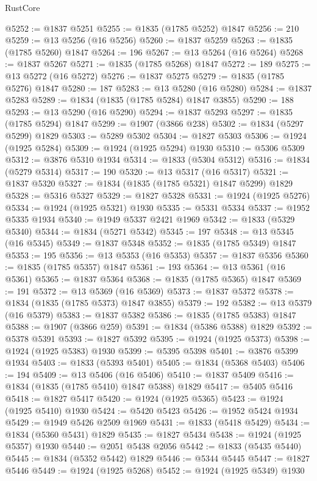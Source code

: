 \begin{lexlean}{RustCore}
\begin{coremodule}
@5252 := @1837 @5251
@5255 := @1835 (@1785 @5252) @1847
@5256 := 210
@5259 := @13 @5256 (@16 @5256)
@5260 := @1837 @5259
@5263 := @1835 (@1785 @5260) @1847
@5264 := 196
@5267 := @13 @5264 (@16 @5264)
@5268 := @1837 @5267
@5271 := @1835 (@1785 @5268) @1847
@5272 := 189
@5275 := @13 @5272 (@16 @5272)
@5276 := @1837 @5275
@5279 := @1835 (@1785 @5276) @1847
@5280 := 187
@5283 := @13 @5280 (@16 @5280)
@5284 := @1837 @5283
@5289 := @1834 (@1835 (@1785 @5284) @1847 @3855)
@5290 := 188
@5293 := @13 @5290 (@16 @5290)
@5294 := @1837 @5293
@5297 := @1835 (@1785 @5294) @1847
@5299 := @1907 (@3866 @238)
@5302 := @1834 (@5297 @5299) @1829
@5303 := @5289 @5302
@5304 := @1827 @5303
@5306 := @1924 (@1925 @5284)
@5309 := @1924 (@1925 @5294) @1930
@5310 := @5306 @5309
@5312 := @3876 @5310 @1934
@5314 := @1833 (@5304 @5312)
@5316 := @1834 (@5279 @5314)
@5317 := 190
@5320 := @13 @5317 (@16 @5317)
@5321 := @1837 @5320
@5327 := @1834 (@1835 (@1785 @5321) @1847 @5299) @1829
@5328 := @5316 @5327
@5329 := @1827 @5328
@5331 := @1924 (@1925 @5276)
@5334 := @1924 (@1925 @5321) @1930
@5335 := @5331 @5334
@5337 := @1952 @5335 @1934
@5340 := @1949 @5337 @2421 @1969
@5342 := @1833 (@5329 @5340)
@5344 := @1834 (@5271 @5342)
@5345 := 197
@5348 := @13 @5345 (@16 @5345)
@5349 := @1837 @5348
@5352 := @1835 (@1785 @5349) @1847
@5353 := 195
@5356 := @13 @5353 (@16 @5353)
@5357 := @1837 @5356
@5360 := @1835 (@1785 @5357) @1847
@5361 := 193
@5364 := @13 @5361 (@16 @5361)
@5365 := @1837 @5364
@5368 := @1835 (@1785 @5365) @1847
@5369 := 191
@5372 := @13 @5369 (@16 @5369)
@5373 := @1837 @5372
@5378 := @1834 (@1835 (@1785 @5373) @1847 @3855)
@5379 := 192
@5382 := @13 @5379 (@16 @5379)
@5383 := @1837 @5382
@5386 := @1835 (@1785 @5383) @1847
@5388 := @1907 (@3866 @259)
@5391 := @1834 (@5386 @5388) @1829
@5392 := @5378 @5391
@5393 := @1827 @5392
@5395 := @1924 (@1925 @5373)
@5398 := @1924 (@1925 @5383) @1930
@5399 := @5395 @5398
@5401 := @3876 @5399 @1934
@5403 := @1833 (@5393 @5401)
@5405 := @1834 (@5368 @5403)
@5406 := 194
@5409 := @13 @5406 (@16 @5406)
@5410 := @1837 @5409
@5416 := @1834 (@1835 (@1785 @5410) @1847 @5388) @1829
@5417 := @5405 @5416
@5418 := @1827 @5417
@5420 := @1924 (@1925 @5365)
@5423 := @1924 (@1925 @5410) @1930
@5424 := @5420 @5423
@5426 := @1952 @5424 @1934
@5429 := @1949 @5426 @2509 @1969
@5431 := @1833 (@5418 @5429)
@5434 := @1834 (@5360 @5431) @1829
@5435 := @1827 @5434
@5438 := @1924 (@1925 @5357) @1930
@5440 := @2051 @5438 @2056
@5442 := @1833 (@5435 @5440)
@5445 := @1834 (@5352 @5442) @1829
@5446 := @5344 @5445
@5447 := @1827 @5446
@5449 := @1924 (@1925 @5268)
@5452 := @1924 (@1925 @5349) @1930

\end{coremodule}
\end{lexlean}
